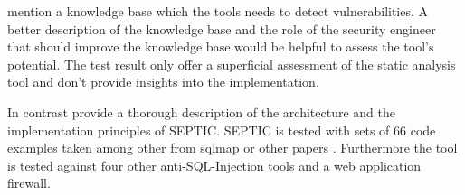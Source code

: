 \textcite[]{Maskur2019} mention a knowledge base which the tools needs to detect vulnerabilities. A better description of the knowledge base and the role of the security engineer that should improve the knowledge base would be helpful to assess the tool's potential. The test result only offer a superficial assessment of the static analysis tool and don't provide insights into the implementation.\newline  

In contrast \textcite[1170-1180]{Medeiros2019} provide a thorough description of the architecture and the implementation principles of SEPTIC. SEPTIC is tested with sets of 66 code examples taken among other from sqlmap \autocite[]{DameleA.G.2014} or other papers \autocite[]{Ray2012, Ray2014}. Furthermore the tool is tested against four other anti-SQL-Injection tools and a web application firewall.


